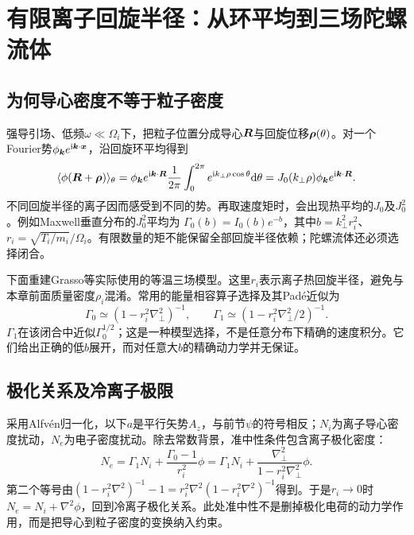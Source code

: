 
\section{有限离子回旋半径：从环平均到三场陀螺流体}
\subsection{为何导心密度不等于粒子密度}
强导引场、低频$\omega\ll\Omega_i$下，把粒子位置分成导心$\bm{R}$与回旋位移$\bm{\rho}(\theta)$。对一个Fourier势$\phi_{\bm{k}}e^{\mathrm i\bm{k}\cdot\bm{x}}$，沿回旋环平均得到
\begin{equation}
 \langle\phi(\bm{R}+\bm{\rho})\rangle_\theta
 =\phi_{\bm{k}}e^{\mathrm i\bm{k}\cdot\bm{R}}
 \frac1{2\pi}\int_0^{2\pi}e^{\mathrm i k_\perp\rho\cos\theta}\mathrm d\theta
 =J_0(k_\perp\rho)\phi_{\bm{k}}e^{\mathrm i\bm{k}\cdot\bm{R}}.
\end{equation}
不同回旋半径的离子因而感受到不同的势。再取速度矩时，会出现热平均的$J_0$及$J_0^2$。例如Maxwell垂直分布的$J_0^2$平均为
$\Gamma_0(b)=I_0(b)e^{-b}$，其中$b=k_\perp^2r_i^2$、$r_i=\sqrt{T_i/m_i}/\Omega_i$。有限数量的矩不能保留全部回旋半径依赖；陀螺流体还必须选择闭合。

下面重建Grasso等实际使用的等温三场模型。这里$r_i$表示离子热回旋半径，避免与本章前面质量密度$\rho_i$混淆。常用的能量相容算子选择及其Pad\'e近似为
\begin{equation}
 \Gamma_0\simeq(1-r_i^2\nabla_\perp^2)^{-1},\qquad
 \Gamma_1\simeq(1-r_i^2\nabla_\perp^2/2)^{-1}.
\end{equation}
$\Gamma_1$在该闭合中近似$\Gamma_0^{1/2}$；这是一种模型选择，不是任意分布下精确的速度积分。它们给出正确的低$b$展开，而对任意大$b$的精确动力学并无保证。

\subsection{极化关系及冷离子极限}
采用Alfvén归一化，以下$a$是平行矢势$A_z$，与前节$\psi$的符号相反；$N_i$为离子导心密度扰动，$N_e$为电子密度扰动。除去常数背景，准中性条件包含离子极化密度：
\begin{equation}
 N_e=\Gamma_1N_i+\frac{\Gamma_0-1}{r_i^2}\phi
 =\Gamma_1N_i+\frac{\nabla_\perp^2}{1-r_i^2\nabla_\perp^2}\phi.
 \label{eq:gyro_pol}
\end{equation}
第二个等号由$(1-r_i^2\nabla^2)^{-1}-1=
 r_i^2\nabla^2(1-r_i^2\nabla^2)^{-1}$得到。于是$r_i\to0$时
$N_e=N_i+\nabla^2\phi$，回到冷离子极化关系。此处准中性不是删掉极化电荷的动力学作用，而是把导心到粒子密度的变换纳入约束。

